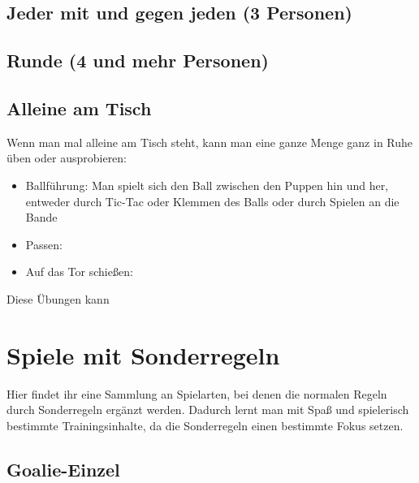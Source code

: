 \subsection{Jeder mit und gegen jeden (3 Personen)}
\label{spielformen:npersonen:jedergegenjeden}

\subsection{Runde (4 und mehr Personen)}
\label{spielformen:npersonen:runde}





\subsection{Alleine am Tisch}
\label{spielformen:npersonen:alleine}

Wenn man mal alleine am Tisch steht, kann man eine ganze Menge ganz in Ruhe üben oder ausprobieren:
\begin{itemize}
\item Ballführung: Man spielt sich den Ball zwischen den Puppen hin und her, entweder durch Tic-Tac oder Klemmen des Balls oder durch Spielen an die Bande 
\item Passen:
\item Auf das Tor schießen: 
\end{itemize}
Diese Übungen kann



\section{Spiele mit Sonderregeln}
\label{spielformen:sonderregeln}

Hier findet ihr eine Sammlung an Spielarten, bei denen die normalen Regeln durch Sonderregeln ergänzt werden. 
Dadurch lernt man mit Spaß und spielerisch bestimmte Trainingsinhalte, da die Sonderregeln einen bestimmte Fokus setzen. 

\subsection{Goalie-Einzel}
\label{spielformen:sonderregeln:goalie}

